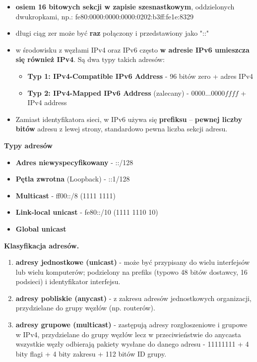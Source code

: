 \documentclass[main.tex]{subfiles}
\begin{document}
    \begin{itemize}[noitemsep]
        \item \textbf{osiem 16 bitowych sekcji w zapisie szesnastkowym}, oddzielonych dwukropkami,
        np.: fe80:0000:0000:0000:0202:b3ff:fe1e:8329
        \item długi ciąg zer może być \textbf{raz} połączony i przedstawiony jako "::"
        \item w środowisku z węzłami IPv4 oraz IPv6 często \textbf{w adresie IPv6 umieszcza się również IPv4}. Są dwa typy takich adresów:
        \begin{itemize}
            \item \textbf{Typ 1: IPv4-Compatible IPv6 Address} - 96 bitów zero + adres IPv4
            \item \textbf{Typ 2: IPv4-Mapped IPv6 Address} (zalecany) - $0000...0000ffff$ + IPv4 address
        \end{itemize}
        \item Zamiast identyfikatora sieci, w IPv6 używa się \textbf{prefiksu} --  \textbf{pewnej liczby bitów} adresu
        z lewej strony, standardowo pewna liczba sekcji adresu.
    \end{itemize}

    \noindent \textbf{Typy adresów}
    \begin{itemize}[noitemsep]
        \item \textbf{Adres niewyspecyfikowany} - ::/128
        \item \textbf{Pętla zwrotna} (Loopback) - ::1/128
        \item \textbf{Multicast} - ff00::/8 (1111 1111)
        \item \textbf{Link-local unicast} - fe80::/10 (1111 1110 10)
        \item \textbf{Global unicast}
    \end{itemize}

    \noindent \textbf{Klasyfikacja adresów.}
    \begin{enumerate}
        \item \textbf{adresy jednostkowe (unicast)} - może być przypisany do wielu interfejsów lub wielu komputerów;
        podzielony na prefiks (typowo 48 bitów dostawcy, 16 podsieci) i identyfikator interfejsu.
        \item \textbf{adresy pobliskie (anycast)} - z zakresu adresów jednostkowych organizacji, przydzielane do grupy
        węzłów (np. routerów).
        \item \textbf{adresy grupowe (multicast)} - zastępują adresy rozgłoszeniowe i grupowe w IPv4, przydzielane do
        grupy węzłów lecz w przeciwieństwie do anycasta wszystkie węzły odbierają pakiety wysłane do danego adresu
        - 11111111 + 4 bity flagi + 4 bity zakresu + 112 bitów ID grupy.
    \end{enumerate}
\end{document}

